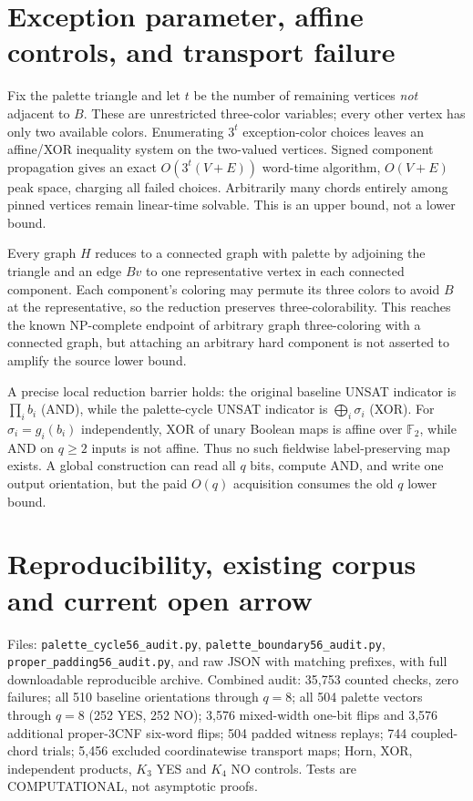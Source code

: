 \documentclass[11pt]{article}
\begin{document}
\section*{Exception parameter, affine controls, and transport failure}
Fix the palette triangle and let $t$ be the number of remaining vertices \emph{not} adjacent to $B$. These are unrestricted three-color variables; every other vertex has only two available colors. Enumerating $3^t$ exception-color choices leaves an affine/XOR inequality system on the two-valued vertices. Signed component propagation gives an exact $O(3^t(V+E))$ word-time algorithm, $O(V+E)$ peak space, charging all failed choices. Arbitrarily many chords entirely among pinned vertices remain linear-time solvable. This is an upper bound, not a lower bound.

Every graph $H$ reduces to a connected graph with palette by adjoining the triangle and an edge $Bv$ to one representative vertex in each connected component. Each component's coloring may permute its three colors to avoid $B$ at the representative, so the reduction preserves three-colorability. This reaches the known NP-complete endpoint of arbitrary graph three-coloring with a connected graph, but attaching an arbitrary hard component is not asserted to amplify the source lower bound.

A precise local reduction barrier holds: the original baseline UNSAT indicator is $\prod_i b_i$ (AND), while the palette-cycle UNSAT indicator is $\bigoplus_i \sigma_i$ (XOR). For $\sigma_i=g_i(b_i)$ independently, XOR of unary Boolean maps is affine over $\mathbb F_2$, while AND on $q\ge2$ inputs is not affine. Thus no such fieldwise label-preserving map exists. A global construction can read all $q$ bits, compute AND, and write one output orientation, but the paid $O(q)$ acquisition consumes the old $q$ lower bound.

\section*{Reproducibility, existing corpus and current open arrow}
Files: \texttt{palette\_cycle56\_audit.py}, \texttt{palette\_boundary56\_audit.py}, \texttt{proper\_padding56\_audit.py}, and raw JSON with matching prefixes, with full downloadable reproducible archive. Combined audit: 35,753 counted checks, zero failures; all 510 baseline orientations through $q=8$; all 504 palette vectors through $q=8$ (252 YES, 252 NO); 3,576 mixed-width one-bit flips and 3,576 additional proper-3CNF six-word flips; 504 padded witness replays; 744 coupled-chord trials; 5,456 excluded coordinatewise transport maps; Horn, XOR, independent products, $K_3$ YES and $K_4$ NO controls. Tests are COMPUTATIONAL, not asymptotic proofs.
\end{document}
